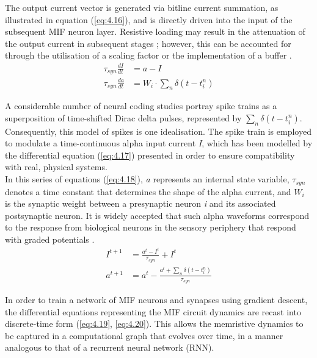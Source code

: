 \noindent The output current vector is generated via bitline current summation, as illustrated in equation (\ref{eq:4.16}), and is directly driven into the input of the subsequent MIF neuron layer. Resistive loading may result in the attenuation of the output current in subsequent stages \cite{wang2020high}; however, this can be accounted for through the utilisation of a scaling factor or the implementation of a buffer \cite{wang2022low}.
\begin{align}
\tau_{syn} \frac{dI}{dt} &= a - I \label{eq:4.17} \\
\tau_{syn}\frac{da}{dt} &= W_i \cdot\sum_{n}\delta\left( t - t_i^n \right) \label{eq:4.18}
\end{align}

\noindent A considerable number of neural coding studies portray spike trains as a superposition of time-shifted Dirac delta pulses, represented by $\sum_{n}\delta\left( t - t_i^n \right)$. Consequently, this model of spikes is one idealisation. The spike train is employed to modulate a time-continuous alpha input current \textit{I}, which has been modelled by the differential equation (\ref{eq:4.17}) presented in order to ensure compatibility with real, physical systems. \\

\noindent In this series of equations (\ref{eq:4.18}), \textit{a} represents an internal state variable, $\tau_{syn}$ denotes a time constant that determines the shape of the alpha current, and $W_i$ is the synaptic weight between a presynaptic neuron \textit{i} and its associated postsynaptic neuron. It is widely accepted that such alpha waveforms correspond to the response from biological neurons in the sensory periphery that respond with graded potentials \cite{eshraghian2018formulation}.
\begin{align}
I^{t+1} &= \frac{a^t - I^t}{\tau_{syn}} + I^t \label{eq:4.19} \\
a^{t+1} &= a^t - \frac{a^t + \sum_{n}\delta\left( t - t_i^n \right)}{\tau_{syn}} \label{eq:4.20}
\end{align}

\noindent In order to train a network of MIF neurons and synapses using gradient descent, the differential equations representing the MIF circuit dynamics are recast into discrete-time form (\ref{eq:4.19}, \ref{eq:4.20}). This allows the memristive dynamics to be captured in a computational graph that evolves over time, in a manner analogous to that of a recurrent neural network (RNN).\\

